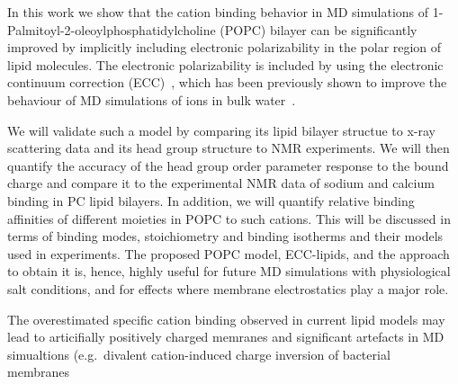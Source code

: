 \documentclass[aip,jcp,twocolumn]{revtex4}
\begin{document}


In this work we show that the cation binding behavior
in MD simulations of 1-Palmitoyl-2-oleoylphosphatidylcholine (POPC) bilayer can be significantly 
improved by implicitly including electronic polarizability
in the polar region of lipid molecules. The electronic
polarizability is included by using the electronic
continuum correction (ECC)~\cite{leontyev11}, which
has been previously shown to improve the behaviour of
MD simulations of ions in bulk water~\cite{Jungwirth2017,Jungwirth2015,kohagen14,kohagen16}. 


We will validate such a model by comparing its lipid bilayer structue
to x-ray scattering data and its head group structure to NMR experiments. 
We will then quantify the accuracy of the head group order parameter response to the bound charge
and compare it to the experimental NMR data of sodium and calcium binding in PC lipid bilayers. 
In addition, we will quantify relative binding affinities of different moieties in POPC to such cations. 
This will be discussed in terms of binding modes, stoichiometry and binding isotherms and their models used in experiments.
The proposed POPC model, ECC-lipids, and the approach to obtain it
is, hence, highly useful for future MD simulations with physiological salt conditions, 
and for effects where membrane electrostatics play a major role.

The overestimated specific cation binding observed in current lipid models \cite{catte16}
may lead to articifially positively charged memranes and significant artefacts in
MD simualtions (e.g.~divalent cation-induced charge inversion of bacterial membranes~\cite{Luan2016}

\end{document}
